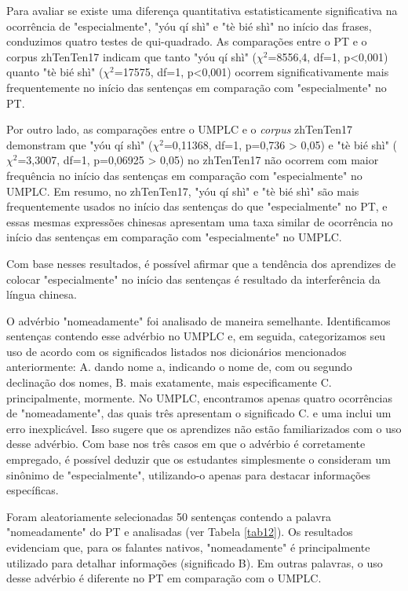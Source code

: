 \documentclass[portuguese]{textolivre}
\begin{document}
Para avaliar se existe uma diferença quantitativa estatisticamente significativa na ocorrência de "especialmente", "yóu qí shì" e "tè bié shì" no início das frases, conduzimos quatro testes de qui-quadrado. As comparações entre o PT e o corpus zhTenTen17 indicam que tanto "yóu qí shì" (\(\chi\)\(^2\)=8556,4, df=1, p<0,001) quanto "tè bié shì" (\(\chi\)\(^2\)=17575, df=1, p<0,001) ocorrem significativamente mais frequentemente no início das sentenças em comparação com "especialmente" no PT.

Por outro lado, as comparações entre o UMPLC e o \textit{corpus} zhTenTen17 demonstram que "yóu qí shì" (\(\chi\)\(^2\)=0,11368, df=1, p=0,736 > 0,05) e "tè bié shì" (\(\chi\)\(^2\)=3,3007, df=1, p=0,06925 > 0,05) no zhTenTen17 não ocorrem com maior frequência no início das sentenças em comparação com "especialmente" no UMPLC. Em resumo, no zhTenTen17, "yóu qí shì" e "tè bié shì" são mais frequentemente usados no início das sentenças do que "especialmente" no PT, e essas mesmas expressões chinesas apresentam uma taxa similar de ocorrência no início das sentenças em comparação com "especialmente" no UMPLC.


Com base nesses resultados, é possível afirmar que a tendência dos aprendizes de colocar "especialmente" no início das sentenças é resultado da interferência da língua chinesa.

O advérbio "nomeadamente" foi analisado de maneira semelhante. Identificamos sentenças contendo esse advérbio no UMPLC e, em seguida, categorizamos seu uso de acordo com os significados listados nos dicionários mencionados anteriormente: A. dando nome a, indicando o nome de, com ou segundo declinação dos nomes, B. mais exatamente, mais especificamente C. principalmente, mormente. No UMPLC, encontramos apenas quatro ocorrências de "nomeadamente", das quais três apresentam o significado C. e uma inclui um erro inexplicável. Isso sugere que os aprendizes não estão familiarizados com o uso desse advérbio. Com base nos três casos em que o advérbio é corretamente empregado, é possível deduzir que os estudantes simplesmente o consideram um sinônimo de "especialmente", utilizando-o apenas para destacar informações específicas.   

Foram aleatoriamente selecionadas 50 sentenças contendo a palavra "nomeadamente" do PT e analisadas (ver Tabela \ref{tab12}). Os resultados evidenciam que, para os falantes nativos, "nomeadamente" é principalmente utilizado para detalhar informações (significado B). Em outras palavras, o uso desse advérbio é diferente no PT em comparação com o UMPLC.
\end{document}

